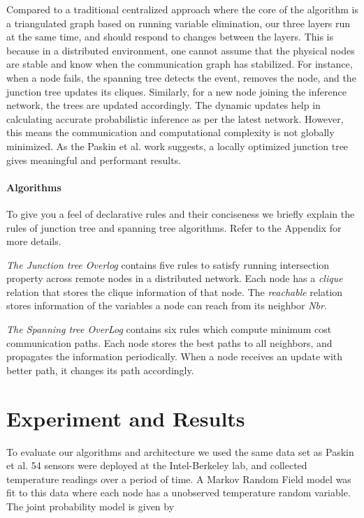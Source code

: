Compared to a traditional centralized approach where the core of the algorithm
is a triangulated graph based on running variable elimination, our three
layers run at the same time, and should respond to changes between the layers.
This is because in a distributed environment, one cannot assume that the
physical nodes are stable and know when the communication graph has
stabilized. For instance, when a node fails, the spanning tree detects the
event, removes the node, and the junction tree updates its cliques. Similarly,
for a new node joining the inference network, the trees are updated
accordingly. The dynamic updates help in calculating accurate probabilistic
inference as per the latest network. However, this means the communication and
computational complexity is not globally minimized. As the Paskin et al. work
suggests, a locally optimized junction tree gives meaningful and performant
results.

\paragraph{Algorithms}

To give you a feel of declarative rules and their conciseness we briefly
explain the rules of junction tree and spanning tree algorithms. Refer to the
Appendix for more details.

\emph{The Junction tree Overlog} contains five rules to satisfy running
intersection property across remote nodes in a distributed network. Each node
has a \textit{clique} relation that stores the clique information of that
node. The \textit{reachable} relation stores information of the variables a
node can reach from its neighbor \textit{Nbr}.

\emph{The Spanning tree OverLog} contains six rules which compute minimum cost
communication paths. Each node stores the best paths to all neighbors, and
propagates the information periodically. When a node receives an update with
better path, it changes its path accordingly.

\section{Experiment and Results}
\label{sec:exre}

To evaluate our algorithms and architecture we used the same data set as
Paskin et al. 54 sensors were deployed at the Intel-Berkeley lab, and
collected temperature readings over a period of time. A Markov Random Field
model was fit to this data where each node has a unobserved temperature random
variable. The joint probability model is given by

